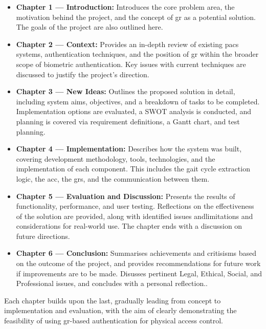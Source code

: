 \begin{itemize}
    \item \textbf{Chapter 1 --- Introduction:} Introduces the core problem area, the motivation behind the project, and the concept of \ac{gr} as a potential solution. The goals of the project are also outlined here.

    \item \textbf{Chapter 2 --- Context:} Provides an in-depth review of existing \ac{pacs} systems, authentication techniques, and the position of \ac{gr} within the broader scope of biometric authentication. Key issues with current techniques are discussed to justify the project's direction.

    \item \textbf{Chapter 3 --- New Ideas:} Outlines the proposed solution in detail, including system aims, objectives, and a breakdown of tasks to be completed. Implementation options are evaluated, a SWOT analysis is conducted, and planning is covered via requirement definitions, a Gantt chart, and test planning.

    \item \textbf{Chapter 4 --- Implementation:} Describes how the system was built, covering development methodology, tools, technologies, and the implementation of each component. This includes the gait cycle extraction logic, the \ac{acc}, the \ac{grs}, and the communication between them.

    \item \textbf{Chapter 5 --- Evaluation and Discussion:} Presents the results of functionality, performance, and user testing. Reflections on the effectiveness of the solution are provided, along with identified issues andlimitations and considerations for real-world use. The chapter ends with a discussion on future directions.
    
    \item \textbf{Chapter 6 --- Conclusion:} Summarises achievements and critisisms based on the outcome of the project, and provides recommendations for future work if improvements are to be made. Disusses pertinent Legal, Ethical, Social, and Professional issues, and concludes with a personal reflection..

\end{itemize}

Each chapter builds upon the last, gradually leading from concept to implementation and evaluation, with the aim of clearly demonstrating the feasibility of using \ac{gr}-based authentication for physical access control.
